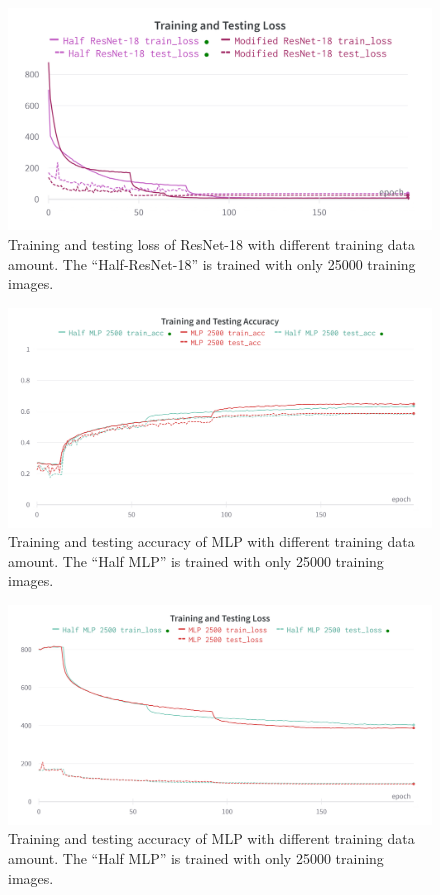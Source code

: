 \documentclass[twocolumn, draft]{extarticle}
\begin{document}
\begin{appendices}
\begin{figure}[H]
\centering
\includegraphics[width=0.9\linewidth]{charts/resnet-half-cifar-loss}
\caption{Training and testing loss of ResNet-18 with different training data amount. The ``Half-ResNet-18'' is trained with only 25000 training images.}
\label{fig:resnet-half-cifar-loss}
\end{figure}

\begin{figure}[H]
\centering
\includegraphics[width=0.9\linewidth]{charts/mlp-half-cifar-acc}
\caption{Training and testing accuracy of MLP with different training data amount. The ``Half MLP'' is trained with only 25000 training images.}
\label{fig:mlp-half-cifar-acc}
\end{figure}

\begin{figure}[H]
\centering
\includegraphics[width=0.9\linewidth]{charts/mlp-half-cifar-loss}
\caption{Training and testing accuracy of MLP with different training data amount. The ``Half MLP'' is trained with only 25000 training images.}
\label{fig:mlp-half-cifar-loss}
\end{figure}



\end{appendices}
\end{document}
